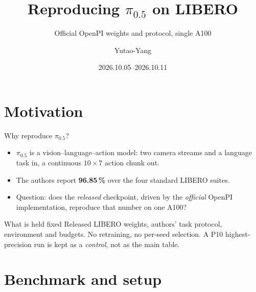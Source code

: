 

\title{Reproducing \texorpdfstring{$\pi_{0.5}$}{pi-0.5} on LIBERO}
\subtitle{Official OpenPI weights and protocol, single A100}
\author{Yutao-Yang}
\date{2026.10.05--2026.10.11}

\egotitleframe%
\egooutline%

\section{Motivation}

\begin{frame}{Why reproduce \texorpdfstring{$\pi_{0.5}$}{pi-0.5}?}
  \begin{itemize}
    \item \texorpdfstring{$\pi_{0.5}$}{pi-0.5} is a vision--language--action
          model: two camera streams and a language task in, a continuous
          $10 \times 7$ action chunk out.
    \item The authors report \textbf{96.85\,\%} over the four standard LIBERO
          suites.
    \item Question: does the \emph{released} checkpoint, driven by the
          \emph{official} OpenPI implementation, reproduce that number on one
          A100?
  \end{itemize}
  \vfill
  \begin{block}{What is held fixed}
    Released LIBERO weights, authors' task protocol, environment and budgets.
    No retraining, no per-seed selection. A P10 highest-precision run is kept
    as a \emph{control}, not as the main table.
  \end{block}
\end{frame}

\section{Benchmark and setup}

